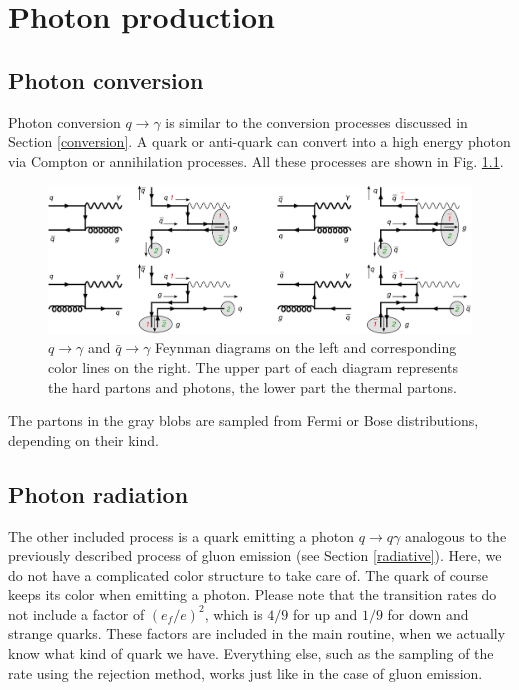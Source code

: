 \chapter{Photon production}
\label{photons}
\section{Photon conversion}
Photon conversion $q\rightarrow\gamma$ is similar to the conversion processes discussed in Section
 \ref{conversion}. A quark or anti-quark can convert into a high energy photon via
Compton or annihilation processes. All these processes are shown in Fig. \ref{fig:photonConv}.
\begin{figure}[htb]
  \begin{center}
    \includegraphics[width=16cm]{photonConversion1}
    \caption{$q\rightarrow \gamma$ and $\bar{q}\rightarrow \gamma$ 
      Feynman diagrams on the left and corresponding color lines on the right. 
      The upper part of each diagram represents the hard partons and photons, 
      the lower part the thermal partons.
      \label{fig:photonConv}}
  \end{center}
\end{figure}
The partons in the gray blobs are sampled from Fermi or Bose distributions, 
depending on their kind.

\section{Photon radiation}
\label{photonradiation}
The other included process is a quark emitting a photon $q\rightarrow q\gamma$ 
analogous to the previously described process of gluon emission 
(see Section \ref{radiative}).
Here, we do not have a complicated color structure to take care of. The quark 
of course keeps its color when emitting a photon. 
Please note that the transition rates do not include a factor of $(e_f/e)^2$, which 
is $4/9$ for up and $1/9$ for down and strange quarks. These factors are included 
in the main routine, when we actually know what kind of quark we have.
Everything else, such as the sampling of the rate using the rejection method, works
just like in the case of gluon emission.

